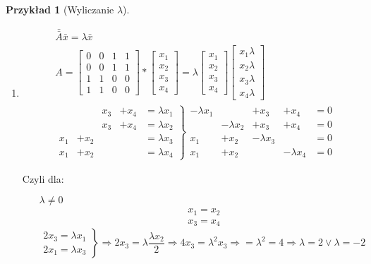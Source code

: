 \documentclass[a4paper,12pt]{article}
\theoremstyle{definition}%
\newtheorem{example}{Przykład}
\newtheorem*{example*}{Przykład} %
\theoremstyle{definition}
\theoremstyle{problem}
\begin{document}
\begin{example*}[Wyliczanie $\lambda$]
\begin{enumerate}[label=\Roman*.]
\item \begin{align*}
&\bar{\bar{A}}\bar{x}=\lambda \bar{x} \\
&A=\begin{bmatrix}
0&0&1&1\\
0&0&1&1\\
1&1&0&0\\
1&1&0&0
\end{bmatrix}*\begin{bmatrix}
x_1\\x_2\\x_3\\x_4
\end{bmatrix}=\lambda \begin{bmatrix}
x_1\\x_2\\x_3\\x_4
\end{bmatrix}\begin{bmatrix}
x_1\lambda\\x_2\lambda\\x_3\lambda\\x_4\lambda
\end{bmatrix}\\
&\left.\begin{matrix}
&&x_3 &+x_4 &= \lambda x_1\\
&&x_3 &+x_4 &= \lambda x_2\\
x_1 &+ x_2 &&&= \lambda x_3\\
x_1 &+ x_2 &&&= \lambda x_4
\end{matrix}\right\}\begin{matrix}
-\lambda x_1 & &+x_3 &+x_4 &=0\\
&-\lambda x_2 &+x_3 &+x_4 &=0\\
x_1 &+ x_2 &-\lambda x_3 &&=0\\
x_1 &+ x_2 &&-\lambda x_4 &=0
\end{matrix}
\end{align*}

\newpage
Czyli dla:
\begin{itemize}
\item[$\lambda \neq 0$] 
\begin{align*}
&x_1=x_2\\
&x_3=x_4
\end{align*}
$$\left. \begin{matrix}
2x_3=\lambda x_1\\
2x_1=\lambda x_3
\end{matrix}\right\}\Rightarrow 2x_3=\lambda \frac{\lambda x_2}{2} \Rightarrow 4x_3=\lambda ^2 x_3\Rightarrow =\lambda ^2=4\Rightarrow \lambda = 2 \lor \lambda = -2$$


\end{itemize}
\end{enumerate}
\end{example*}
\end{document}
